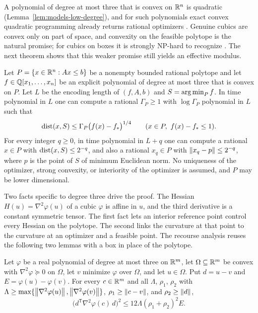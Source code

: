 A polynomial of degree at most three that is convex on $\mathbb R^n$ is quadratic
(Lemma~\ref{lem:models-low-degree}), and for such polynomials exact convex
quadratic programming already returns rational optimizers
\citep{KozlovTarasovKhachiyan1980}. Genuine cubics are convex only on part of
space, and convexity on the feasible polytope is the natural promise; for
cubics on boxes it is strongly NP-hard to recognize
\citep[Theorem~2.3]{AhmadiHall2020}. The next theorem shows that this weaker
promise still yields an effective modulus.

\begin{theorem}\label{thm:cubic-point}
Let $P=\{x\in\mathbb R^n:Ax\le b\}$ be a nonempty bounded rational polytope and let
$f\in\mathbb Q[x_1,\ldots,x_n]$ be an explicit polynomial of degree at most three
that is convex on $P$. Let $L$ be the encoding length of $(f,A,b)$ and
$S=\operatorname*{arg\,min}_Pf$. In time polynomial in $L$ one can compute a rational
$\Gamma_P\ge1$ with $\log\Gamma_P$ polynomial in $L$ such that
\[
 \operatorname{dist}(x,S)\le\Gamma_P\bigl(f(x)-f_*\bigr)^{1/4}\qquad
 (x\in P,\ f(x)-f_*\le1).
\]
For every integer $q\ge0$, in time polynomial in $L+q$ one can compute a
rational $x\in P$ with $\operatorname{dist}(x,S)\le2^{-q}$, and also a rational $x_q\in P$
with $\left\lVert x_q-p\right\rVert\le2^{-q}$, where $p$ is the point of $S$ of minimum
Euclidean norm. No uniqueness of the optimizer, strong convexity, or
interiority of the optimizer is assumed, and $P$ may be lower dimensional.
\end{theorem}

Two facts specific to degree three drive the proof. The Hessian
$H(u)=\nabla^2\varphi(u)$ of a cubic $\varphi$ is affine in $u$, and the
third derivative is a constant symmetric tensor. The first fact lets an
interior reference point control every Hessian on the polytope. The second
links the curvature at that point to the curvature at an optimizer and a
feasible point. The recourse analysis reuses the following two lemmas with a
box in place of the polytope.

\begin{lemma}\label{lem:points-cubic-transverse}
Let $\varphi$ be a real polynomial of degree at most three on $\mathbb R^m$, let
$\Omega\subseteq\mathbb R^m$ be convex with $\nabla^2\varphi\succeq0$ on $\Omega$,
let $v$ minimize $\varphi$ over $\Omega$, and let $u\in\Omega$. Put $d=u-v$
and $E=\varphi(u)-\varphi(v)$. For every $c\in\mathbb R^m$ and all $\Lambda$,
$\rho_1$, $\rho_2$ with
$\Lambda\ge\max\{\left\lVert\nabla^2\varphi(u)\right\rVert,\left\lVert\nabla^2\varphi(v)\right\rVert\}$,
$\rho_1\ge\left\lVert c-v\right\rVert$, and $\rho_2\ge\left\lVert d\right\rVert$,
\[
 \bigl(d^{\mathsf T}\nabla^2\varphi(c)\,d\bigr)^2\le12\Lambda(\rho_1+\rho_2)^2E .
\]
\end{lemma}

